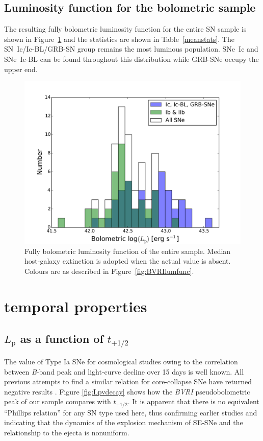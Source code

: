 \documentclass[a4paper,fleqn,usenatbib]{mnras}
\begin{document}
\subsection{Luminosity function for the bolometric sample}

The resulting fully bolometric luminosity function for the entire SN sample is shown in Figure~\ref{fig:ONIRlumfunc} and the statistics are shown in Table~\ref{meanstats}. The SN~Ic/Ic-BL/GRB-SN group remains the most luminous population. SNe~Ic and SNe~Ic-BL can be found throughout this distribution while GRB-SNe occupy the upper end.

\begin{figure}
\centering
\includegraphics[scale=0.4]{ONIR-lumfunc.pdf}
\caption{Fully bolometric luminosity function of the entire sample. Median host-galaxy extinction is adopted when the actual value is absent. Colours are as described in Figure~\ref{fig:BVRIlumfunc}.}
\label{fig:ONIRlumfunc}
\end{figure}

\section{temporal properties}
\subsection{$L_{\mathrm{p}}$ as a function of $t_{+1/2}$}
The value of Type Ia SNe for cosmological studies owing to the correlation between \textit{B}-band peak and light-curve decline over 15 days \citep{Phillips1993} is well known. All previous attempts to find a similar relation for core-collapse SNe have returned negative results \citep{Drout2011,Lyman2014}. Figure \ref{fig:Lpvdecay} shows how the {\it BVRI} pseudobolometric peak of our sample compares with $t_{+1/2}$. It is apparent that there is no equivalent ``Phillips relation'' for any SN type used here, thus confirming earlier studies and indicating that the dynamics of the explosion mechanism of SE-SNe and the relationship to the ejecta is nonuniform. 
\end{document}
